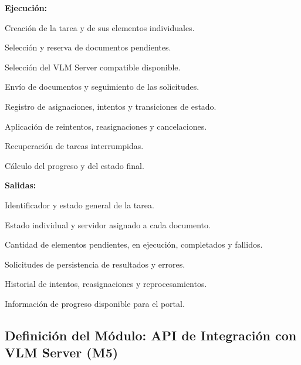 \begin{definicionmodulo}
\textbf{Ejecución:}
\begin{elementosmodulo}
    \item Creación de la tarea y de sus elementos individuales.
    \item Selección y reserva de documentos pendientes.
    \item Selección del VLM Server compatible disponible.
    \item Envío de documentos y seguimiento de las solicitudes.
    \item Registro de asignaciones, intentos y transiciones de estado.
    \item Aplicación de reintentos, reasignaciones y cancelaciones.
    \item Recuperación de tareas interrumpidas.
    \item Cálculo del progreso y del estado final.
\end{elementosmodulo}

\textbf{Salidas:}
\begin{elementosmodulo}
    \item Identificador y estado general de la tarea.
    \item Estado individual y servidor asignado a cada documento.
    \item Cantidad de elementos pendientes, en ejecución, completados y fallidos.
    \item Solicitudes de persistencia de resultados y errores.
    \item Historial de intentos, reasignaciones y reprocesamientos.
    \item Información de progreso disponible para el portal.
\end{elementosmodulo}

\end{definicionmodulo}



\subsection{Definición del Módulo: API de Integración con VLM Server (M5)}
\label{subsec:modulo_m5}

